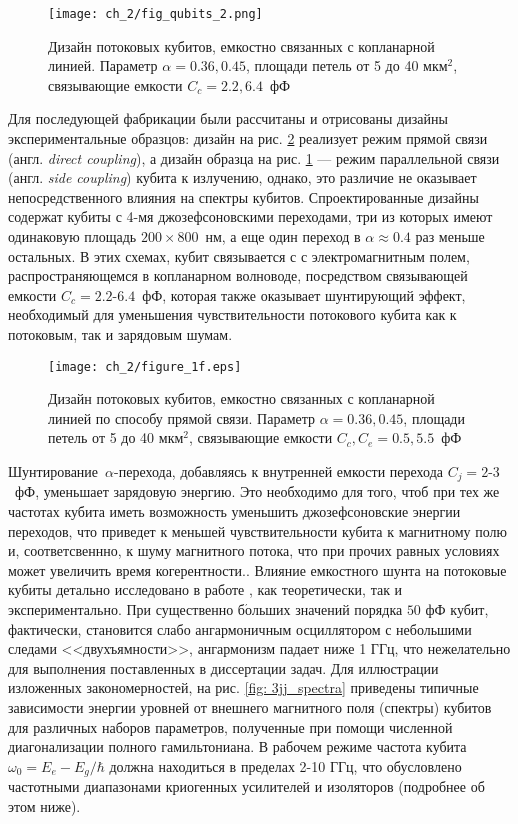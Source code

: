 \begin{figure}[htb]\center
	\texttt{[image: ch\_2/fig\_qubits\_2.png]} \hfill
	\caption[width=0.6\textwidth]{Дизайн потоковых кубитов, емкостно связанных с копланарной линией. Параметр $\alpha=0.36,0.45$, площади петель от 5 до 40 мкм$^2$, связывающие емкости $C_c=2.2,6.4$~фФ }
	\label{fig: qubits_cap}
\end{figure}

Для последующей фабрикации были рассчитаны и отрисованы дизайны экспериментальные образцов: дизайн на рис. \ref{fig: qubits_sps} реализует режим прямой связи (англ. \textit{direct coupling}), а дизайн образца на рис.
\ref{fig: qubits_cap} --- режим параллельной связи (англ. \textit{side coupling}) кубита к излучению, однако, это различие не оказывает непосредственного влияния на спектры кубитов. Спроектированные дизайны содержат кубиты с 4-мя джозефсоновскими переходами, три из которых имеют одинаковую площадь $200\times800$~нм, а еще один переход в $\alpha\approx0.4$ раз меньше остальных. В этих схемах, кубит связывается с с электромагнитным полем, распространяющемся в копланарном волноводе, посредством связывающей емкости $C_c=2.2$-$6.4$~фФ, которая также оказывает шунтирующий эффект, необходимый для уменьшения чувствительности потокового кубита как к потоковым, так и зарядовым шумам.

\begin{figure}[htb]\center
	\texttt{[image: ch\_2/figure\_1f.eps]} \hfill
	\caption[width=0.6\textwidth]{Дизайн потоковых кубитов, емкостно связанных с копланарной линией по способу прямой связи. Параметр $\alpha=0.36,0.45$, площади петель от 5 до 40 мкм$^2$, связывающие емкости $C_c,C_e =0.5,5.5$~фФ }
	\label{fig: qubits_sps}
\end{figure}

Шунтирование~$\alpha$-перехода, добавляясь к внутренней емкости перехода $C_j=2$-$3$~фФ, уменьшает зарядовую энергию. Это необходимо для того, чтоб при тех же частотах кубита иметь возможность уменьшить джозефсоновские энергии переходов, что приведет к меньшей чувствительности кубита к магнитному полю и, соответсвеннно, к шуму магнитного потока, что при прочих равных условиях может увеличить время когерентности.. Влияние емкостного шунта на потоковые кубиты детально исследовано в работе \cite{yan2016flux}, как теоретически, так и экспериментально. При существенно б$\acute{\text{о}}$льших значений порядка $50$ фФ кубит, фактически, становится слабо ангармоничным осциллятором с небольшими следами <<двухъямности>>, ангармонизм падает ниже 1 ГГц, что нежелательно для выполнения поставленных в диссертации задач. Для иллюстрации изложенных закономерностей, на рис. \ref{fig: 3jj_spectra} приведены типичные зависимости энергии уровней от внешнего магнитного поля (спектры) кубитов для различных наборов параметров, полученные при помощи численной диагонализации полного гамильтониана. В рабочем режиме частота кубита $\omega_0=E_e-E_g/\hbar$ должна находиться в пределах 2-10 ГГц, что обусловлено частотными диапазонами криогенных усилителей и изоляторов (подробнее об этом ниже).

